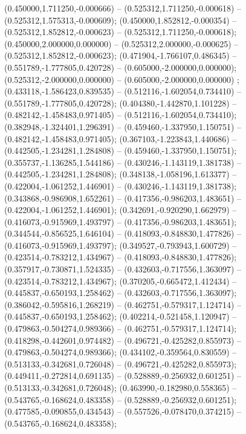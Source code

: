  (0.450000,1.711250,-0.000666) -- (0.525312,1.711250,-0.000618) -- (0.525312,1.575313,-0.000609);
 (0.450000,1.852812,-0.000354) -- (0.525312,1.852812,-0.000623) -- (0.525312,1.711250,-0.000618);
 (0.450000,2.000000,0.000000) -- (0.525312,2.000000,-0.000625) -- (0.525312,1.852812,-0.000623);
 (0.471904,-1.766107,0.486345) -- (0.551789,-1.777805,0.420728) -- (0.605000,-2.000000,0.000000);
 (0.525312,-2.000000,0.000000) -- (0.605000,-2.000000,0.000000) ;
 (0.433118,-1.586423,0.839535) -- (0.512116,-1.602054,0.734410) -- (0.551789,-1.777805,0.420728);
 (0.404380,-1.442870,1.101228) -- (0.482142,-1.458483,0.971405) -- (0.512116,-1.602054,0.734410);
 (0.382948,-1.324401,1.296391) -- (0.459460,-1.337950,1.150751) -- (0.482142,-1.458483,0.971405);
 (0.367103,-1.223843,1.440686) -- (0.442505,-1.234281,1.284808) -- (0.459460,-1.337950,1.150751);
 (0.355737,-1.136285,1.544186) -- (0.430246,-1.143119,1.381738) -- (0.442505,-1.234281,1.284808);
 (0.348138,-1.058196,1.613377) -- (0.422004,-1.061252,1.446901) -- (0.430246,-1.143119,1.381738);
 (0.343868,-0.986908,1.652261) -- (0.417356,-0.986203,1.483651) -- (0.422004,-1.061252,1.446901);
 (0.342691,-0.920290,1.662979) -- (0.416073,-0.915969,1.493797) -- (0.417356,-0.986203,1.483651);
 (0.344544,-0.856525,1.646104) -- (0.418093,-0.848830,1.477826) -- (0.416073,-0.915969,1.493797);
 (0.349527,-0.793943,1.600729) -- (0.423514,-0.783212,1.434967) -- (0.418093,-0.848830,1.477826);
 (0.357917,-0.730871,1.524335) -- (0.432603,-0.717556,1.363097) -- (0.423514,-0.783212,1.434967);
 (0.370205,-0.665472,1.412434) -- (0.445837,-0.650193,1.258462) -- (0.432603,-0.717556,1.363097);
 (0.386042,-0.595816,1.268219) -- (0.462751,-0.579317,1.124714) -- (0.445837,-0.650193,1.258462);
 (0.402214,-0.521458,1.120947) -- (0.479863,-0.504274,0.989366) -- (0.462751,-0.579317,1.124714);
 (0.418298,-0.442601,0.974482) -- (0.496721,-0.425282,0.855973) -- (0.479863,-0.504274,0.989366);
 (0.434102,-0.359564,0.830559) -- (0.513133,-0.342681,0.726048) -- (0.496721,-0.425282,0.855973);
 (0.449411,-0.272814,0.691135) -- (0.528889,-0.256932,0.601251) -- (0.513133,-0.342681,0.726048);
 (0.463990,-0.182980,0.558365) -- (0.543765,-0.168624,0.483358) -- (0.528889,-0.256932,0.601251);
 (0.477585,-0.090855,0.434543) -- (0.557526,-0.078470,0.374215) -- (0.543765,-0.168624,0.483358);
